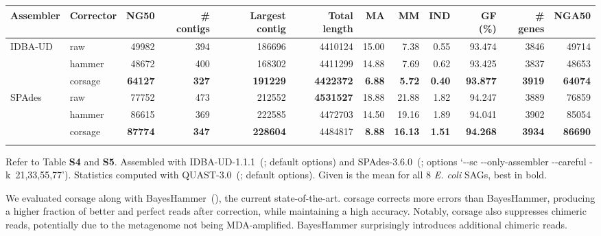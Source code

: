 \documentclass{bioinfo}
\begin{document}
\begin{table*}[b]
{\footnotesize
\begin{tabular}{llrrrrrrrrrr}
\toprule
Assembler & Corrector & NG50  & \# contigs & Largest contig & Total length  & MA    & MM    & IND  & GF (\%) & \# genes & NGA50 \\
\midrule
IDBA-UD   & raw       & 49982 & 394        & 186696         & 4410124       & 15.00 &  7.38 & 0.55 & 93.474  & 3846 & 49714 \\
          & hammer    & 48672 & 400        & 168302         & 4411299       & 14.88 &  7.69 & 0.62 & 93.425  & 3837 & 48653 \\
          & corsage   & \textbf{64127} & \textbf{327}        & \textbf{191229}         & \textbf{4422372}       &  \textbf{6.88} &  \textbf{5.72} & \textbf{0.40} & \textbf{93.877}  & \textbf{3919} & \textbf{64074} \\
\midrule
SPAdes    & raw       & 77752 & 473        & 212552         & \textbf{4531527}       & 18.88 & 21.88 & 1.82 & 94.247 & 3889 & 76859 \\
          & hammer    & 86615 & 369        & 222585         & 4472703       & 14.50 & 19.16 & 1.89 & 94.041  & 3902 & 85054 \\
          & corsage   & \textbf{87774} & \textbf{347}        & \textbf{228604}         & 4484817       &  \textbf{8.88} & \textbf{16.13} & \textbf{1.51} & \textbf{94.268}  & \textbf{3934} & \textbf{86690} \\
\botrule
\end{tabular}}{Refer to Table \textbf{S4} and \textbf{S5}. %
Assembled with IDBA-UD-1.1.1~(\citealp{idba_ud}; default options) and SPAdes-3.6.0~(\citealp{spades1}; options `\mbox{-{}-sc} \mbox{-{}-only-assembler} \mbox{-{}-careful} \mbox{-k 21,33,55,77}').
Statistics computed with QUAST-3.0~(\citealp{quast}; default options).
Given is the mean for all 8 \textit{E. coli} SAGs, best in bold.
}
\end{table*}

We evaluated corsage along with BayesHammer~(\citealp{bayeshammer}), the current state-of-the-art. %
corsage corrects more errors than BayesHammer, producing a higher fraction of better and perfect reads after correction, while maintaining a high accuracy.
Notably, corsage also suppresses chimeric reads, potentially due to the metagenome not being MDA-amplified. BayesHammer surprisingly introduces additional chimeric reads.
\end{document}
